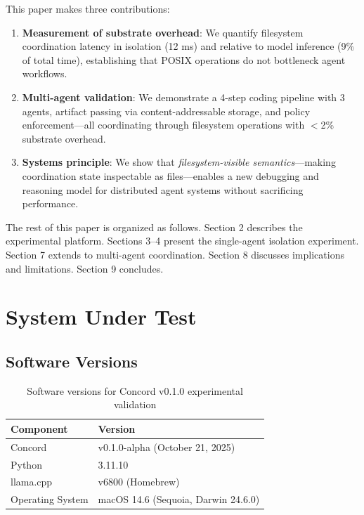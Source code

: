 \documentclass[11pt]{article}
\begin{document}
This paper makes three contributions:
\begin{enumerate}
\item \textbf{Measurement of substrate overhead}: We quantify filesystem coordination latency in isolation (12 ms) and relative to model inference (9\% of total time), establishing that POSIX operations do not bottleneck agent workflows.

\item \textbf{Multi-agent validation}: We demonstrate a 4-step coding pipeline with 3 agents, artifact passing via content-addressable storage, and policy enforcement---all coordinating through filesystem operations with $<$2\% substrate overhead.

\item \textbf{Systems principle}: We show that \emph{filesystem-visible semantics}---making coordination state inspectable as files---enables a new debugging and reasoning model for distributed agent systems without sacrificing performance.
\end{enumerate}

The rest of this paper is organized as follows. Section 2 describes the experimental platform. Sections 3--4 present the single-agent isolation experiment. Section 7 extends to multi-agent coordination. Section 8 discusses implications and limitations. Section 9 concludes.

\section{System Under Test}

\subsection{Software Versions}

\begin{table}[h]
\centering
\begin{tabular}{ll}
\toprule
\textbf{Component} & \textbf{Version} \\
\midrule
Concord & v0.1.0-alpha (October 21, 2025) \\
Python & 3.11.10 \\
llama.cpp & v6800 (Homebrew) \\
Operating System & macOS 14.6 (Sequoia, Darwin 24.6.0) \\
\bottomrule
\end{tabular}
\caption{Software versions for Concord v0.1.0 experimental validation}
\label{tab:versions}
\end{table}
\end{document}
